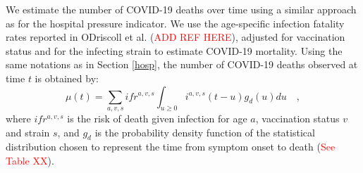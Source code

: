 We estimate the number of COVID-19 deaths over time using a similar approach 
as for the hospital pressure indicator. We use the age-specific infection fatality rates reported in
ODriscoll et al. (\textcolor{red}{ADD REF HERE}), adjusted for vaccination status and for the infecting strain
to estimate COVID-19 mortality. Using the same notations as in Section \ref{hosp}, the number of COVID-19
deaths observed at time $t$ is obtained by:
\begin{equation}
\mu(t) = \sum_{a,v,s} ifr^{a,v,s} \int_{u \geq 0}  i^{a,v,s}(t-u)g_{d}(u) du   \quad,
\end{equation}
where $ifr^{a,v,s}$ is the risk of death given infection for age $a$, vaccination status $v$ and strain $s$, 
and $g_d$ is the probability density function of the statistical distribution chosen to represent the 
time from symptom onset to death (\textcolor{red}{See Table XX}).